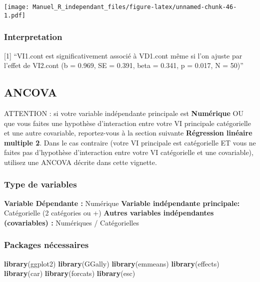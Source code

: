 \documentclass[
]{book}
\newenvironment{Shaded}{\begin{snugshade}}{\end{snugshade}}
\newcommand{\KeywordTok}[1]{\textcolor[rgb]{0.13,0.29,0.53}{\textbf{#1}}}
\newcommand{\NormalTok}[1]{#1}
\begin{document}
\texttt{[image: Manuel\_R\_independant\_files/figure-latex/unnamed-chunk-46-1.pdf]}

\hypertarget{interpretation-4}{%
\subsubsection{Interpretation}\label{interpretation-4}}

{[}1{]} ``VI1.cont est significativement associé à VD1.cont même si l'on ajuste par l'effet de VI2.cont (b = 0.969, SE = 0.391, beta = 0.341, p = 0.017, N = 50)''

\hypertarget{ancova}{%
\subsection{ANCOVA}\label{ancova}}

ATTENTION : si votre variable indépendante principale est \textbf{Numérique} OU que vous faites une hypothèse d'interaction entre votre VI principale catégorielle et une autre covariable, reportez-vous à la section suivante \textbf{Régression linéaire multiple 2}.
Dans le cas contraire (votre VI principale est catégorielle ET vous ne faites pas d'hypothèse d'interaction entre votre VI catégorielle et une covariable), utilisez une ANCOVA décrite dans cette vignette.

\hypertarget{type-de-variables-5}{%
\subsubsection{Type de variables}\label{type-de-variables-5}}

\textbf{Variable Dépendante :} Numérique
\textbf{Variable indépendante principale:} Catégorielle (2 catégories ou +)
\textbf{Autres variables indépendantes (covariables) :} Numériques / Catégorielles

\hypertarget{packages-nuxe9cessaires-5}{%
\subsubsection{Packages nécessaires}\label{packages-nuxe9cessaires-5}}

\begin{Shaded}
\begin{Highlighting}[]
\KeywordTok{library}\NormalTok{(ggplot2)}
\KeywordTok{library}\NormalTok{(GGally)}
\KeywordTok{library}\NormalTok{(emmeans)}
\KeywordTok{library}\NormalTok{(effects)}
\KeywordTok{library}\NormalTok{(car)}
\KeywordTok{library}\NormalTok{(forcats)}
\KeywordTok{library}\NormalTok{(esc)}
\end{Highlighting}
\end{Shaded}
\end{document}
